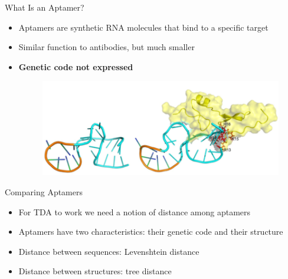 \documentclass{beamer}
\begin{document}
\begin{frame}{What Is an Aptamer?}
\begin{itemize}
  \item Aptamers are synthetic RNA molecules that bind to a specific target
  \item Similar function to antibodies, but much smaller
  \item \textbf{Genetic code not expressed}
  \begin{figure}
    \begin{center}
      \includegraphics[width=1\textwidth]{aptamer.png}
    \end{center}  
  \end{figure}
\end{itemize}
  
\end{frame}

\begin{frame}{Comparing Aptamers}
  \begin{itemize}
    \item For TDA to work we need a notion of distance among aptamers
    \item Aptamers have two characteristics: their genetic code and their structure
    \item Distance between sequences: Levenshtein distance
    \item Distance between structures: tree distance
  \end{itemize}
\end{frame}
\end{document}
